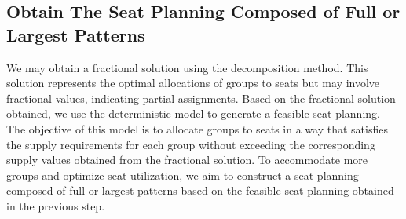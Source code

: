 \subsection{Obtain The Seat Planning Composed of Full or Largest Patterns}\label{seat_assignment}
We may obtain a fractional solution using the decomposition method. This solution represents the optimal allocations of groups to seats but may involve fractional values, indicating partial assignments. Based on the fractional solution obtained, we use the deterministic model to generate a feasible seat planning. The objective of this model is to allocate groups to seats in a way that satisfies the supply requirements for each group without exceeding the corresponding supply values obtained from the fractional solution. To accommodate more groups and optimize seat utilization, we aim to construct a seat planning composed of full or largest patterns based on the feasible seat planning obtained in the previous step. 






